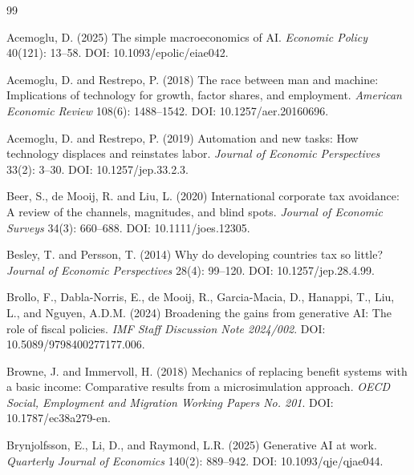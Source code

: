 \documentclass[11pt,a4paper]{article}
\begin{document}
\begin{thebibliography}{99}
\raggedright

Acemoglu, D. (2025)
\newblock The simple macroeconomics of AI.
\newblock \emph{Economic Policy} 40(121): 13--58. DOI: 10.1093/epolic/eiae042.

Acemoglu, D. and Restrepo, P. (2018)
\newblock The race between man and machine: Implications of technology for growth, factor shares, and employment.
\newblock \emph{American Economic Review} 108(6): 1488--1542. DOI: 10.1257/aer.20160696.

Acemoglu, D. and Restrepo, P. (2019)
\newblock Automation and new tasks: How technology displaces and reinstates labor.
\newblock \emph{Journal of Economic Perspectives} 33(2): 3--30. DOI: 10.1257/jep.33.2.3.

Beer, S., de Mooij, R. and Liu, L. (2020)
\newblock International corporate tax avoidance: A review of the channels, magnitudes, and blind spots.
\newblock \emph{Journal of Economic Surveys} 34(3): 660--688. DOI: 10.1111/joes.12305.

Besley, T. and Persson, T. (2014)
\newblock Why do developing countries tax so little?
\newblock \emph{Journal of Economic Perspectives} 28(4): 99--120. DOI: 10.1257/jep.28.4.99.

Brollo, F., Dabla-Norris, E., de Mooij, R., Garcia-Macia, D., Hanappi, T., Liu, L., and Nguyen, A.D.M. (2024)
\newblock Broadening the gains from generative AI: The role of fiscal policies.
\newblock \emph{IMF Staff Discussion Note 2024/002}. DOI: 10.5089/9798400277177.006.

Browne, J. and Immervoll, H. (2018)
\newblock Mechanics of replacing benefit systems with a basic income: Comparative results from a microsimulation approach.
\newblock \emph{OECD Social, Employment and Migration Working Papers No. 201}. DOI: 10.1787/ec38a279-en.

Brynjolfsson, E., Li, D., and Raymond, L.R. (2025)
\newblock Generative AI at work.
\newblock \emph{Quarterly Journal of Economics} 140(2): 889--942. DOI: 10.1093/qje/qjae044.


\end{thebibliography}
\end{document}
